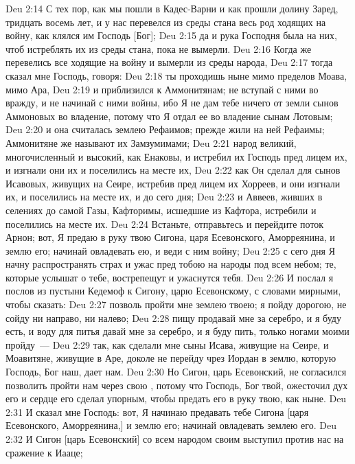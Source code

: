 \vs Deu 2:14 С тех пор, как мы пошли в Кадес-Варни и как прошли долину Заред,  тридцать восемь лет, и у нас перевелся из среды стана весь род ходящих на войну, как клялся им Господь [Бог];
\vs Deu 2:15 да и рука Господня была на них, чтоб истреблять их из среды стана, пока не вымерли.
\vs Deu 2:16 Когда же перевелись все ходящие на войну и вымерли из среды народа,
\vs Deu 2:17 тогда сказал мне Господь, говоря:
\vs Deu 2:18 ты проходишь ныне мимо пределов Моава, мимо Ара,
\vs Deu 2:19 и приблизился к Аммонитянам; не вступай с ними во вражду, и не начинай с ними войны, ибо Я не дам тебе ничего от земли сынов Аммоновых во владение, потому что Я отдал ее во владение сынам Лотовым;
\vs Deu 2:20 и она считалась землею Рефаимов; прежде жили на ней Рефаимы; Аммонитяне же называют их Замзумимами;
\vs Deu 2:21 народ великий, многочисленный и высокий, как  Енаковы, и истребил их Господь пред лицем их, и изгнали они их и поселились на месте их,
\vs Deu 2:22 как Он сделал для сынов Исавовых, живущих на Сеире, истребив пред лицем их Хорреев, и они изгнали их, и поселились на месте их, и  до сего дня;
\vs Deu 2:23 и Аввеев, живших в селениях до самой Газы, Кафторимы, исшедшие из Кафтора, истребили и поселились на месте их.
\vs Deu 2:24 Встаньте, отправьтесь и перейдите поток Арнон; вот, Я предаю в руку твою Сигона, царя Есевонского, Аморреянина, и землю его; начинай овладевать ею, и веди с ним войну;
\vs Deu 2:25 с сего дня Я начну распространять страх и ужас пред тобою на народы под всем небом; те, которые услышат о тебе, вострепещут и ужаснутся тебя.
\vs Deu 2:26 И послал я послов из пустыни Кедемоф к Сигону, царю Есевонскому, с словами мирными, чтобы сказать:
\vs Deu 2:27 позволь пройти мне землею твоею; я пойду дорогою, не сойду ни направо, ни налево;
\vs Deu 2:28 пищу продавай мне за серебро, и я буду есть, и воду для питья давай мне за серебро, и я буду пить, только ногами моими пройду~---
\vs Deu 2:29 так, как сделали мне сыны Исава, живущие на Сеире, и Моавитяне, живущие в Аре, доколе не перейду чрез Иордан в землю, которую Господь, Бог наш, дает нам.
\vs Deu 2:30 Но Сигон, царь Есевонский, не согласился позволить пройти нам через свою , потому что Господь, Бог твой, ожесточил дух его и сердце его сделал упорным, чтобы предать его в руку твою, как  ныне.
\vs Deu 2:31 И сказал мне Господь: вот, Я начинаю предавать тебе Сигона [царя Есевонского, Аморреянина,] и землю его; начинай овладевать землею его.
\vs Deu 2:32 И Сигон [царь Есевонский] со всем народом своим выступил против нас на сражение к Иааце;
